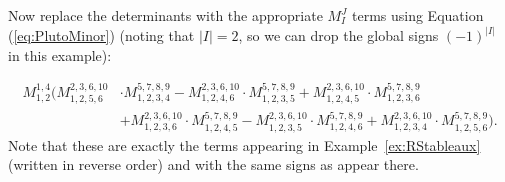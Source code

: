 \documentclass[ALCO, Unicode]{cedram}
\numberwithin{equation}{section}
\begin{document}
\begin{example}
Now replace the determinants with the appropriate $M^J_I$ terms using Equation (\ref{eq:PlutoMinor}) (noting that $|I| = 2$, so we can drop the global signs $(-1)^{|I|}$ in this example):

\begin{align*}M_{1,2}^{1,4}\Bigg( M_{1,2,5,6}^{2,3,6,10} &\cdot M_{1,2,3,4}^{5,7,8,9}
-M_{1,2,4,6}^{2,3,6,10}\cdot M_{1,2,3,5}^{5,7,8,9}
+M_{1,2,4,5}^{2,3,6,10}\cdot M_{1,2,3,6}^{5,7,8,9}\\
&+M_{1,2,3,6}^{2,3,6,10}\cdot M_{1,2,4,5}^{5,7,8,9} -M_{1,2,3,5}^{2,3,6,10}\cdot M_{1,2,4,6}^{5,7,8,9}+M_{1,2,3,4}^{2,3,6,10}\cdot M_{1,2,5,6}^{5,7,8,9}\Bigg).\end{align*}
Note that these are exactly the terms appearing in Example~\ref{ex:RStableaux} (written in reverse order) and with the same signs as appear there.
\end{example}
\end{document}
